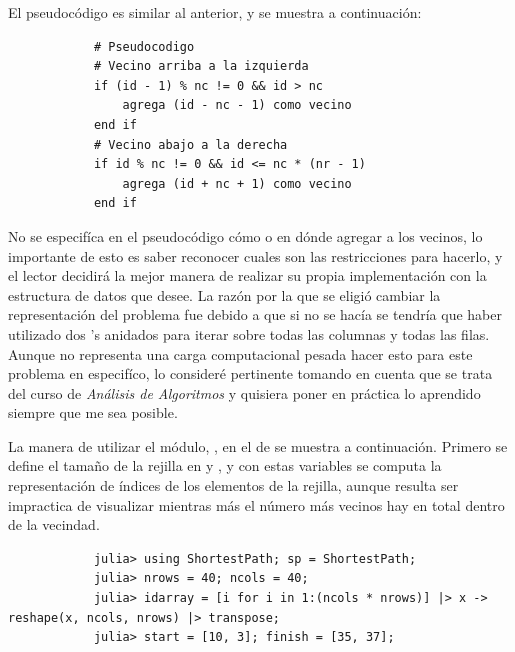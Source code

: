 \begin{enumerate}
\begin{solution}
        El pseudocódigo es similar al anterior, y se muestra a continuación:
        \begin{verbatim}
            # Pseudocodigo
            # Vecino arriba a la izquierda
            if (id - 1) % nc != 0 && id > nc
                agrega (id - nc - 1) como vecino
            end if
            # Vecino abajo a la derecha
            if id % nc != 0 && id <= nc * (nr - 1)
                agrega (id + nc + 1) como vecino
            end if
        \end{verbatim}
        No se especifíca en el pseudocódigo cómo o en dónde agregar a los vecinos, lo importante de esto es saber reconocer cuales son las restricciones para hacerlo, y el lector decidirá la mejor manera de realizar su propia implementación con la estructura de datos que desee. La razón por la que se eligió cambiar la representación del problema fue debido a que si no se hacía se tendría que haber utilizado dos 's anidados para iterar sobre todas las columnas y todas las filas. Aunque no representa una carga computacional pesada hacer esto para este problema en especifíco, lo consideré pertinente tomando en cuenta que se trata del curso de \textit{Análisis de Algoritmos} y quisiera poner en práctica lo aprendido siempre que me sea posible.

        La manera de utilizar el módulo, , en el  de  se muestra a continuación. Primero se define el tamaño de la rejilla en  y , y con estas variables se computa la representación de índices de los elementos de la rejilla, aunque resulta ser impractica de visualizar mientras más el número más vecinos hay en total dentro de la vecindad.
        \begin{verbatim}
            julia> using ShortestPath; sp = ShortestPath;
            julia> nrows = 40; ncols = 40;
            julia> idarray = [i for i in 1:(ncols * nrows)] |> x -> reshape(x, ncols, nrows) |> transpose;
            julia> start = [10, 3]; finish = [35, 37];
        \end{verbatim}


\end{solution}
\end{enumerate}
